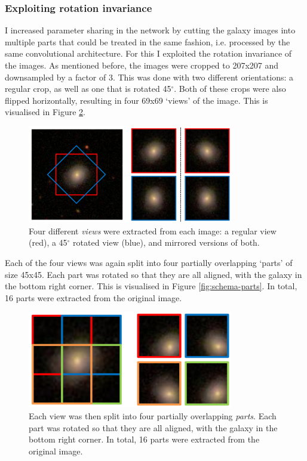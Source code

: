 \documentclass[a4paper,10pt]{article}
\begin{document}
\subsubsection{Exploiting rotation invariance}
\label{sec:exploiting-rotation-invariance}
I increased parameter sharing in the network by cutting the galaxy images into multiple parts that could be treated in the same fashion, i.e. processed by the same convolutional architecture. For this I exploited the rotation invariance of the images. As mentioned before, the images were cropped to 207x207 and downsampled by a factor of 3. This was done with two different orientations: a regular crop, as well as one that is rotated 45$^\circ$. Both of these crops were also flipped horizontally, resulting in four 69x69 `views' of the image. This is visualised in Figure \ref{fig:schema-views}.

\begin{figure}
        \centering
	\includegraphics[width=0.8\textwidth]{schema_views.png}
        \caption{Four different \textit{views} were extracted from each image: a regular view (red), a 45$^\circ$ rotated view (blue), and mirrored versions of both.}\label{fig:schema-views}
\end{figure}


Each of the four views was again split into four partially overlapping `parts' of size 45x45. Each part was rotated so that they are all aligned, with the galaxy in the bottom right corner. This is visualised in Figure \ref{fig:schema-parts}. In total, 16 parts were extracted from the original image.

\begin{figure}
        \centering
	\includegraphics[width=0.8\textwidth]{schema_parts.png}
        \caption{Each view was then split into four partially overlapping \textit{parts}. Each part was rotated so that they are all aligned, with the galaxy in the bottom right corner. In total, 16 parts were extracted from the original image.}\label{fig:schema-views}
\end{figure}
\end{document}
